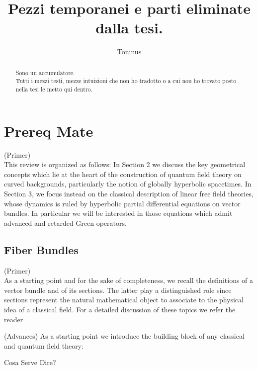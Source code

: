 \documentclass[Main]{subfiles}
\title{Pezzi temporanei e parti eliminate dalla tesi. }
\author{Toninus}
\begin{document}
\maketitle
\begin{abstract}
	Sono un accumulatore.\\
	Tutti i mezzi testi, mezze intuizioni che non ho tradotto o a cui non ho trovato posto nella tesi le metto qui dentro.
\end{abstract}


\chapter{Prereq Mate}

	\begin{Warning}
	(Primer)\\
	This review is organized as follows: In Section 2 we discuss the key geometrical concepts which lie
at the heart of the construction of quantum field theory on curved backgrounds, particularly the notion of globally hyperbolic spacetimes. In Section 3, we focus instead on the classical description of linear free field theories, whose dynamics is ruled by hyperbolic partial differential equations on vector bundles. In particular we will be interested in those equations which admit advanced and retarded Green operators.
	\end{Warning}



	\section{Fiber Bundles}
	\begin{Warning}
	(Primer)\\
	As a starting point and for the sake of completeness, we recall the definitions of a vector bundle and of
its sections. The latter play a distinguished role since sections represent the natural mathematical object to associate to the physical idea of a classical field. For a detailed discussion of these topics we refer the reader
	\end{Warning}
	\begin{Warning}
	(Advances)
	As a starting point we introduce the building block of any classical and quantum field theory:
	\end{Warning}
	
	
	
		Cosa Serve Dire?
\end{document}
